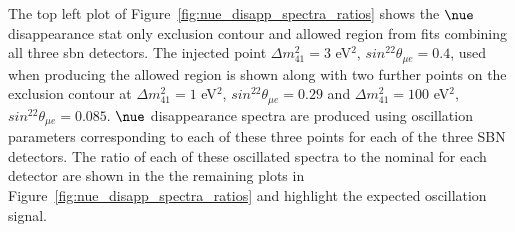 The top left plot of Figure~\ref{fig:nue_disapp_spectra_ratios} shows the $\nue$ disappearance stat only exclusion contour and allowed region from fits combining all three \gls{sbn} detectors. The injected point $\Delta m^2_{41} = 3$ eV$^2$, $sin^22\theta_{\mu e} = 0.4$, used when producing the allowed region is shown along with two further points on the exclusion contour at $\Delta m^2_{41} = 1$ eV$^2$, $sin^22\theta_{\mu e} = 0.29$ and $\Delta m^2_{41} = 100$ eV$^2$, $sin^22\theta_{\mu e} = 0.085$. $\nue$ disappearance spectra are produced using oscillation parameters corresponding to each of these three points for each of the three SBN detectors. The ratio of each of these oscillated spectra to the nominal for each detector are shown in the the remaining plots in Figure~\ref{fig:nue_disapp_spectra_ratios} and highlight the expected oscillation signal.

